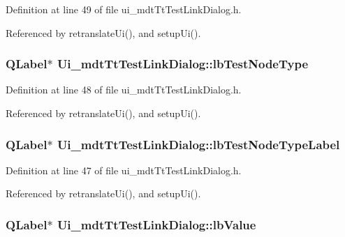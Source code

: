 Definition at line 49 of file ui\-\_\-mdt\-Tt\-Test\-Link\-Dialog.\-h.



Referenced by retranslate\-Ui(), and setup\-Ui().

\hypertarget{class_ui__mdt_tt_test_link_dialog_ad96f863bb060eda0627e0e8c21297520}{
\subsubsection[{lb\-Test\-Node\-Type}]{\setlength{\rightskip}{0pt plus 5cm}Q\-Label$\ast$ Ui\-\_\-mdt\-Tt\-Test\-Link\-Dialog\-::lb\-Test\-Node\-Type}}\label{class_ui__mdt_tt_test_link_dialog_ad96f863bb060eda0627e0e8c21297520}


Definition at line 48 of file ui\-\_\-mdt\-Tt\-Test\-Link\-Dialog.\-h.



Referenced by retranslate\-Ui(), and setup\-Ui().

\hypertarget{class_ui__mdt_tt_test_link_dialog_a304bf53aeeff26e031977f74bc4923f3}{
\subsubsection[{lb\-Test\-Node\-Type\-Label}]{\setlength{\rightskip}{0pt plus 5cm}Q\-Label$\ast$ Ui\-\_\-mdt\-Tt\-Test\-Link\-Dialog\-::lb\-Test\-Node\-Type\-Label}}\label{class_ui__mdt_tt_test_link_dialog_a304bf53aeeff26e031977f74bc4923f3}


Definition at line 47 of file ui\-\_\-mdt\-Tt\-Test\-Link\-Dialog.\-h.



Referenced by retranslate\-Ui(), and setup\-Ui().

\hypertarget{class_ui__mdt_tt_test_link_dialog_a5dc66375bf7acaf3b1ccf26031dba336}{
\subsubsection[{lb\-Value}]{\setlength{\rightskip}{0pt plus 5cm}Q\-Label$\ast$ Ui\-\_\-mdt\-Tt\-Test\-Link\-Dialog\-::lb\-Value}}\label{class_ui__mdt_tt_test_link_dialog_a5dc66375bf7acaf3b1ccf26031dba336}


